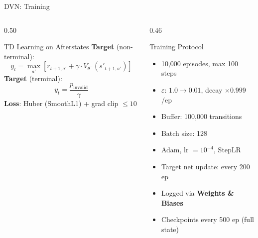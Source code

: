 \documentclass[aspectratio=169,10pt]{beamer}
\begin{document}
\begin{frame}{DVN: Training}
\begin{columns}[T]
\begin{column}{0.50\textwidth}
\begin{block}{TD Learning on Afterstates}
\textbf{Target} (non-terminal):
\[
y_t = \max_{a'} \left[ r_{t+1,a'} + \gamma \cdot V_{\theta^-}(s'_{t+1,a'}) \right]
\]
\textbf{Target} (terminal):
\[
y_t = \frac{p_{\text{invalid}}}{\gamma}
\]
\textbf{Loss}: Huber (SmoothL1) + grad clip $\leq 10$
\end{block}
\end{column}

\begin{column}{0.46\textwidth}
\begin{block}{Training Protocol}
\begin{itemize}
    \item 10,000 episodes, max 100 steps
    \item $\varepsilon$: $1.0 \to 0.01$, decay $\times 0.999$/ep
    \item Buffer: 100,000 transitions
    \item Batch size: 128
    \item Adam, lr $= 10^{-4}$, StepLR
    \item Target net update: every 200 ep
    \item Logged via \textbf{Weights \& Biases}
    \item Checkpoints every 500 ep (full state)
\end{itemize}
\end{block}
\end{column}
\end{columns}
\end{frame}
\end{document}
